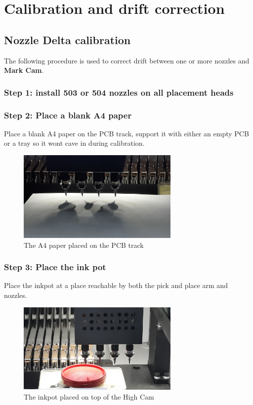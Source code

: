\documentclass[a4paper,10pt]{report}
\begin{document}
\section{Calibration and drift correction}
\subsection{Nozzle Delta calibration}
The following procedure is used to correct drift between one or more nozzles and \textbf{Mark Cam}.
\subsubsection{Step 1: install 503 or 504 nozzles on all placement heads}
\subsubsection{Step 2: Place a blank A4 paper}
Place a blank A4 paper on the PCB track, support it with either an empty PCB or a tray so it wont cave in during calibration.
 \begin{figure}[!htb]
 \centering
 \includegraphics[width=0.7\textwidth]{a4.jpg}
 \caption{The A4 paper placed on the PCB track}
\end{figure}

\subsubsection{Step 3: Place the ink pot}
Place the inkpot at a place reachable by both the pick and place arm and nozzles.
 \begin{figure}[!htb]
 \centering
 \includegraphics[width=0.7\textwidth]{inkpot.jpg}
 \caption{The inkpot placed on top of the High Cam}
\end{figure}
\newpage
\end{document}
